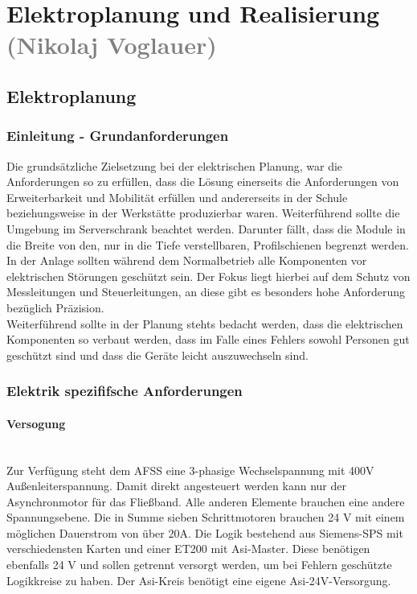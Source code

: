\section{Elektroplanung und Realisierung \textcolor{gray}{(Nikolaj Voglauer)}}

\subsection{Elektroplanung}
\label{sec:Elektroplanung}

\subsubsection{Einleitung - Grundanforderungen}
    Die grundsätzliche Zielsetzung bei der elektrischen Planung, war die Anforderungen so zu erfüllen, dass die Lösung einerseits die Anforderungen von Erweiterbarkeit und Mobilität erfüllen und andererseits in der Schule beziehungsweise in der Werkstätte produzierbar waren. Weiterführend sollte die Umgebung im Serverschrank beachtet werden. Darunter fällt, dass die Module in die Breite von den, nur in die Tiefe verstellbaren, Profilschienen begrenzt werden.\\
    In der Anlage sollten während dem Normalbetrieb alle Komponenten vor elektrischen Störungen geschützt sein. Der Fokus liegt hierbei auf dem Schutz von Messleitungen und Steuerleitungen, an diese gibt es besonders hohe Anforderung bezüglich Präzision.\\ 
    Weiterführend sollte in der Planung stehts bedacht werden, dass die elektrischen Komponenten so verbaut werden, dass im Falle eines Fehlers sowohl Personen gut geschützt sind und dass die Geräte leicht auszuwechseln sind.\\

\subsubsection{Elektrik spezififsche Anforderungen}
\label{sec:Elektrik spezififsche Anforderungen}

    \paragraph{Versogung}\mbox{}\\
    Zur Verfügung steht dem AFSS eine 3-phasige Wechselspannung mit 400V Außenleiterspannung. Damit direkt angesteuert werden kann nur der Asynchronmotor für das Fließband. Alle anderen Elemente brauchen eine andere Spannungsebene. Die in Summe sieben Schrittmotoren brauchen 24 V mit einem möglichen Dauerstrom von über 20A. Die Logik bestehend aus Siemens-SPS mit verschiedensten Karten und einer ET200 mit Asi-Master. Diese benötigen ebenfalls 24 V und sollen getrennt versorgt werden, um bei Fehlern geschützte Logikkreise zu haben. Der Asi-Kreis benötigt eine eigene Asi-24V-Versorgung.

